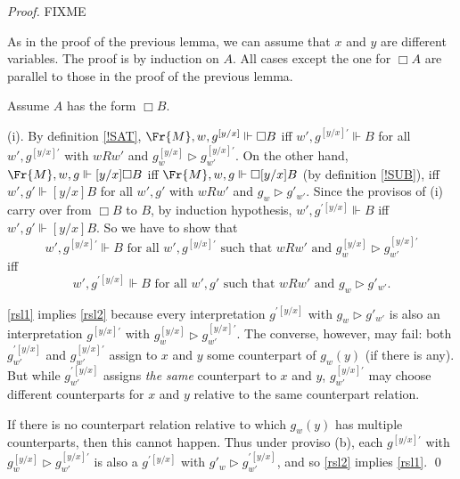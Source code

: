 \documentclass[11pt]{woarticle}
\newcommand{\cmnt}[1]{\iffalse #1 \fi}
\theoremstyle{break}
\theoremstyle{nonumberplain}
\newcommand{\SAT}{\Vdash}
\newcommand{\Img}{\triangleright}
\newcommand{\1}{\;\,|\;\,}
\renewcommand{\t}[1]{\ensuremath{\langle #1  \makebox[.2ex]{}\rangle}}
\begin{document}
\cmnt{%
  The proviso could be weakened to ``it is not the case that a relevant
  counterpart of $g(y)$ has multiple counterparts at any world \emph{reachable}
  from $w$'', where reachability is the transitive closure of accessibility.
  Only considering worlds accessible from $w$ is not enough: if $y$ has only one
  counterpart at all $w'$. but two counterparts at some $w''$, then
  $\t{y:x}\Diamond\Diamond x\!\not=\!y$ is true, but
  $[y/x]\Diamond\Diamond x\!\not=\!y = \Diamond\Diamond y\!\not=\!y$ is false.
}%

\begin{proof}
  FIXME
  
  As in the proof of the previous lemma, we can assume that $x$ and $y$ are
  different variables. The proof is by induction on $A$. All cases except the one for $\Box A$ are parallel to those in the proof of the previous lemma.

  Assume $A$ has the form $\Box B$.

    (i). By definition \ref{!SAT}, $\Fr{M},w,g^{[y/x]} \SAT \Box B$ iff
    $w',g^{[y/x]\prime} \SAT B$ for all $w',g^{[y/x]\prime}$ with
    $wRw'$ and $g^{[y/x]}_w \Img g^{[y/x]\prime}_{w'}$. On the other hand,
    $\Fr{M},w,g \SAT [y/x]\Box B$ iff $\Fr{M},w,g \SAT \Box [y/x]B$ (by definition
    \ref{!SUB}), iff $w',g' \SAT [y/x]B$ for all $w',g'$ with $wRw'$
    and $g_w \Img g'_{w'}$. Since the provisos of (i) carry over from
    $\Box B$ to $B$, by induction hypothesis, $w',g^{\prime [y/x]}
    \SAT B$ iff $w',g' \SAT [y/x]B$. So we have to show that
    \begin{equation}\tag{1}\label{rsl1}
      w',g^{[y/x]\prime} \SAT B \text{ for all $w',g^{[y/x]\prime}$ such that
        $wRw'$ and $g^{[y/x]}_w \Img g^{[y/x]\prime}_{w'}$}
    \end{equation}
    iff
    \begin{equation}\tag{2}\label{rsl2}
      w',g^{\prime[y/x]} \SAT B \text{ for all $w',g'$ such that $wRw'$ and
        $g_w \Img g'_{w'}$.}
    \end{equation}
    
    \eqref{rsl1} implies \eqref{rsl2} because every interpretation
    $g^{\prime[y/x]}$ with $g_w \Img g'_{w'}$ is also an
    interpretation $g^{[y/x]\prime}$ with $g^{[y/x]}_w \Img
    g^{[y/x]\prime}_{w'}$. The converse, however, may fail: both
    $g^{\prime[y/x]}_{w'}$ and $g^{[y/x]\prime}_{w'}$ assign to $x$
    and $y$ some counterpart of $g_w(y)$ (if there is any). But while
    $g^{\prime[y/x]}_{w'}$ assigns \emph{the same} counterpart to $x$
    and $y$, $g^{[y/x]\prime}_{w'}$ may choose different counterparts
    for $x$ and $y$ relative to the same counterpart relation.

    If there is no counterpart relation relative to which $g_w(y)$ has
    multiple counterparts, then this cannot happen. Thus under proviso
    (b), each $g^{[y/x]\prime}$ with $g^{[y/x]}_w \Img
    g^{[y/x]\prime}_{w'}$ is also a $g^{\prime[y/x]}$ with $g'_w \Img
    g^{\prime[y/x]}_{w'}$, and so \eqref{rsl2} implies \eqref{rsl1}. \qed
\end{proof}
\end{document}
